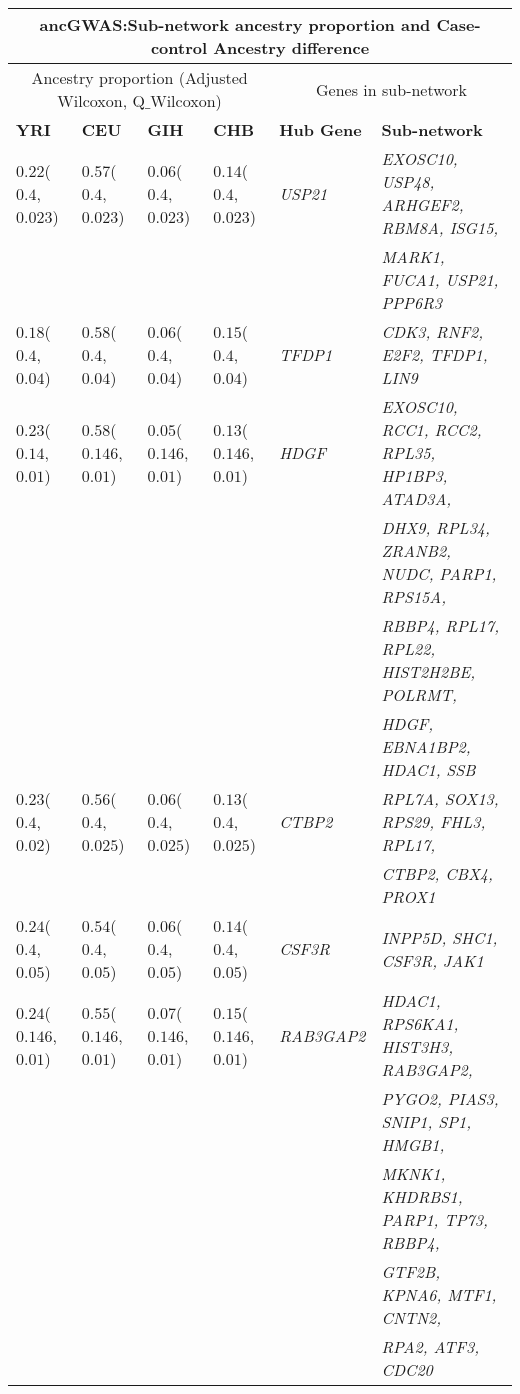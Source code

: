 \documentclass[10pt]{article}
\begin{document}
\begin{landscape}
\begin{table}[!htbp]
{\begin{tabular}{l l l l |l l}
\multicolumn{6}{|c|}{ancGWAS:Sub-network ancestry proportion and Case-control Ancestry difference}  \\[3pt] \hline\hline 
 \multicolumn{4}{c}{Ancestry proportion (Adjusted Wilcoxon, Q$\_$Wilcoxon)} & \multicolumn{2}{c}{Genes in sub-network} \\[3pt] \hline\hline
 \textbf{YRI}& \textbf{CEU}& \textbf{GIH}& \textbf{CHB} &\textbf{Hub Gene} & \textbf{Sub-network} \\[2pt]\hline
$0.22$($0.4$, $0.023$) & $0.57$($0.4$, $0.023$) & $0.06$($0.4$, $0.023$) & $0.14$($0.4$, $0.023$) & \textit{USP21} & \textit{EXOSC10, USP48, ARHGEF2, RBM8A, ISG15,} \\[2pt]
&&&&&\textit{MARK1, FUCA1, USP21, PPP6R3} \\[2pt]
$0.18$($0.4$, $0.04$) & $0.58$($0.4$, $0.04$) & $0.06$($0.4$, $0.04$) & $0.15$($0.4$, $0.04$) & \textit{TFDP1} & \textit{CDK3, RNF2, E2F2, TFDP1, LIN9} \\[2pt]
$0.23$($0.14$, $0.01$) & $0.58$($0.146$, $0.01$) & $0.05$($0.146$, $0.01$) & $0.13$($0.146$, $0.01$) & \textit{HDGF} & \textit{EXOSC10, RCC1, RCC2, RPL35, HP1BP3, ATAD3A,} \\[2pt]
&&&&&\textit{DHX9, RPL34, ZRANB2, NUDC, PARP1, RPS15A,} \\[2pt] 
&&&&&\textit{RBBP4, RPL17, RPL22, HIST2H2BE, POLRMT,} \\[2pt] 
&&&&&\textit{HDGF, EBNA1BP2, HDAC1, SSB} \\[2pt]
$0.23$($0.4$, $0.02$) & $0.56$($0.4$, $0.025$) & $0.06$($0.4$, $0.025$) & $0.13$($0.4$, $0.025$) & \textit{CTBP2} & \textit{RPL7A, SOX13, RPS29, FHL3, RPL17,} \\[2pt] 
&&&&&\textit{CTBP2, CBX4, PROX1} \\[2pt]
$0.24$($0.4$, $0.05$) & $0.54$($0.4$, $0.05$) & $0.06$($0.4$, $0.05$) & $0.14$($0.4$, $0.05$) & \textit{CSF3R} & \textit{INPP5D, SHC1, CSF3R, JAK1} \\[2pt]
$0.24$($0.146$, $0.01$) & $0.55$($0.146$, $0.01$) & $0.07$($0.146$, $0.01$) & $0.15$($0.146$, $0.01$) & \textit{RAB3GAP2} & \textit{HDAC1, RPS6KA1, HIST3H3, RAB3GAP2,} \\[2pt] 
&&&&&\textit{PYGO2, PIAS3, SNIP1, SP1, HMGB1,} \\[2pt] 
&&&&&\textit{MKNK1, KHDRBS1, PARP1, TP73, RBBP4,} \\[2pt]
&&&&&\textit{GTF2B, KPNA6, MTF1, CNTN2,} \\[2pt] 
&&&&&\textit{RPA2, ATF3, CDC20} \\[1.5pt] \hline\hline
\end{tabular}}
\label{tab:pathSIM2}
\end{table}
\end{landscape}
\newpage
\end{document}

